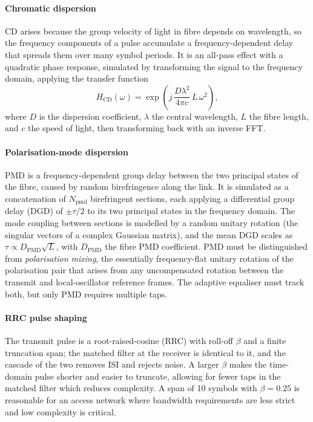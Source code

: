 \documentclass[12pt,a4paper]{report}
\begin{document}
\paragraph{Chromatic dispersion} CD arises because the group velocity of light in fibre depends on wavelength, so the frequency components of a pulse accumulate a frequency-dependent delay that spreads them over many symbol periods. It is an all-pass effect with a quadratic phase response, simulated by transforming the signal to the frequency domain, applying the transfer function
\begin{equation}
    H_\mathrm{CD}(\omega) = \exp\!\left(j\,\frac{D \lambda^2}{4\pi c}\, L\, \omega^2\right),
    \label{eq:cd_channel}
\end{equation}
where $D$ is the dispersion coefficient, $\lambda$ the central wavelength, $L$ the fibre length, and $c$ the speed of light, then transforming back with an inverse FFT.

\paragraph{Polarisation-mode dispersion} PMD is a frequency-dependent group delay between the two principal states of the fibre, caused by random birefringence along the link. It is simulated as a concatenation of $N_\mathrm{pmd}$ birefringent sections, each applying a differential group delay (DGD) of $\pm\tau/2$ to its two principal states in the frequency domain. The mode coupling between sections is modelled by a random unitary rotation (the singular vectors of a complex Gaussian matrix), and the mean DGD scales as $\tau \propto D_\mathrm{PMD}\sqrt{L}$, with $D_\mathrm{PMD}$ the fibre PMD coefficient. PMD must be distinguished from \emph{polarisation mixing}, the essentially frequency-flat unitary rotation of the polarisation pair that arises from any uncompensated rotation between the transmit and local-oscillator reference frames. The adaptive equaliser must track both, but only PMD requires multiple taps.

\paragraph{RRC pulse shaping} The transmit pulse is a root-raised-cosine (RRC) with roll-off $\beta$ and a finite truncation span; the matched filter at the receiver is identical to it, and the cascade of the two removes ISI and rejects noise. A larger $\beta$ makes the time-domain pulse shorter and easier to truncate, allowing for fewer taps in the matched filter which reduces complexity. A span of 10 symbols with $\beta=0.25$ is reasonable for an access network where bandwidth requirements are less strict and low complexity is critical.
\end{document}
